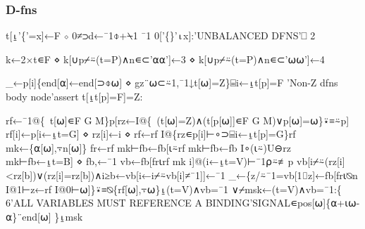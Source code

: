 \documentclass{article}%
\begin{document}
\subsubsection{D-fns}

\nwenddocs{}\endmoddef\nwstartdeflinemarkup{}\nwenddeflinemarkup
t[⍸'\{'=x]←F ⋄ 0≠⊃d←¯1⌽+⍀1 ¯1 0['\{\}'⍳x]:'UNBALANCED DFNS'⎕ 2
\nwendcode{}\nwdocspar

\nwenddocs{}\endmoddef\nwstartdeflinemarkup{}\nwenddeflinemarkup
k←2×t∊F ⋄ k[∪p⌿⍨(t=P)∧n∊⊂'⍺⍺']←3 ⋄ k[∪p⌿⍨(t=P)∧n∊⊂'⍵⍵']←4
\nwendcode{}\nwdocspar

\nwenddocs{}\endmoddef\nwstartdeflinemarkup{}\nwenddeflinemarkup
_←p[i]\{end[⍺]←end[⊃⌽⍵] ⋄ gz¨⍵⊂⍨1,¯1↓t[⍵]=Z\}⌸i←⍸t[p]=F
'Non-Z dfns body node'assert t[⍸t[p]=F]=Z:
\nwendcode{}\nwdocspar

\nwenddocs{}\endmoddef\nwstartdeflinemarkup{}\nwenddeflinemarkup
rf←¯1@\{~t[⍵]∊F G M\}p[rz←I@\{~(t[⍵]=Z)∧(t[p[⍵]]∊F G M)∨p[⍵]=⍵\}⍣≡⍨p]
rf[i]←p[i←⍸t=G] ⋄ rz[i]←i ⋄ rf←rf I@\{rz∊p[i]⊢∘⊃⌸i←⍸t[p]=G\}rf
mk←\{⍺[⍵],⍪n[⍵]\}
fr←rf mk⊢fb←fb[⍳⍨rf mk⊢fb←fb I∘(⍳⍨)U⊖rz mk⊢fb←⍸t=B] ⋄ fb,←¯1
vb←fb[fr⍳rf mk i]@(i←⍸t=V)⊢¯1⍴⍨≢p
vb[i⌿⍨(rz[i]<rz[b])∨(rz[i]=rz[b])∧i≥b←vb[i←i⌿⍨vb[i]≠¯1]]←¯1
_←\{z/⍨¯1=vb[1⌷z]←fb[fr⍳⍉n I@1⊢z←rf I@0⊢⍵]\}⍣≡⍉\{rf[⍵],⍪⍵\}⍸(t=V)∧vb=¯1
∨⌿msk←(t=V)∧vb=¯1:\{
        6'ALL VARIABLES MUST REFERENCE A BINDING'SIGNAL∊pos[⍵]\{⍺+⍳⍵-⍺\}¨end[⍵]
\}⍸msk
\nwendcode{}\nwdocspar
\end{document}
